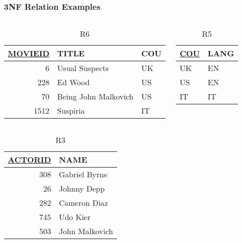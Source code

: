 \documentclass[dvipsnames]{beamer}
\begin{document}
\begin{frame}
  \frametitle{3NF Relation Examples}

  \begin{example}
    \begin{columns}[t]
      \begin{tiny}
      \begin{table}
        \caption{R6}
        \begin{tabular}{|r|l|l|}\hline
\underline{MOVIEID} & TITLE    & COU\\\hline\hline
      6 & Usual Suspects       & UK \\\hline
    228 & Ed Wood              & US \\\hline
     70 & Being John Malkovich & US \\\hline
   1512 & Suspiria             & IT \\\hline
        \end{tabular}
      \end{table}
      \end{tiny}

      \begin{tiny}
      \begin{table}
        \caption{R5}
        \begin{tabular}{|l|l|}\hline
\underline{COU} & LANG\\\hline\hline
UK & EN\\\hline
US & EN\\\hline
IT & IT\\\hline
        \end{tabular}
      \end{table}
      \end{tiny}
    \end{columns}

    \vspace{-0.7cm}
    \begin{columns}[t]
      \begin{tiny}
      \begin{table}
        \caption{R3}
        \begin{tabular}{|r|l|}\hline
\underline{ACTORID} & NAME\\\hline\hline
      308 & Gabriel Byrne \\\hline
       26 & Johnny Depp   \\\hline
      282 & Cameron Diaz  \\\hline
      745 & Udo Kier      \\\hline
      503 & John Malkovich\\\hline
        \end{tabular}
      \end{table}
      \end{tiny}


\end{columns}
\end{example}
\end{frame}
\end{document}
